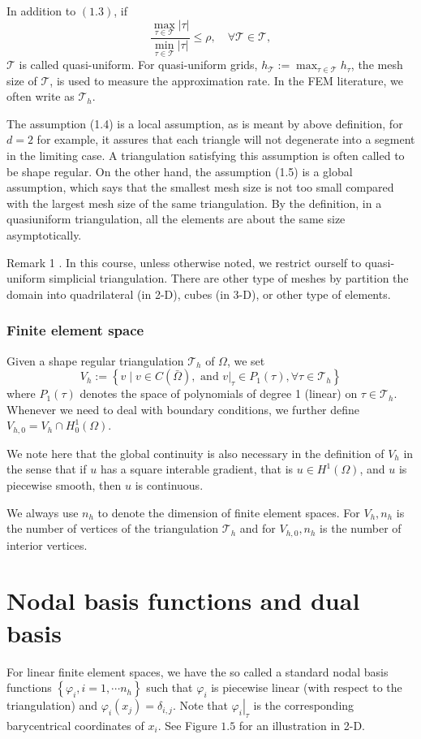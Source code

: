 \documentclass[10pt]{article}
\begin{document}
In addition to $(1.3)$, if
$$
\frac{\max _{\tau \in \mathcal{T}}|\tau|}{\min _{\tau \in \mathcal{T}}|\tau|} \leq \rho, \quad \forall \mathcal{T} \in \mathscr{T},
$$
$\mathscr{T}$ is called quasi-uniform. For quasi-uniform grids, $h_{\mathcal{T}}:=\max _{\tau \in \mathcal{T}} h_{\tau}$, the mesh size of $\mathcal{T}$, is used to measure the approximation rate. In the FEM literature, we often write as $\mathcal{T}_{h}$.

The assumption (1.4) is a local assumption, as is meant by above definition, for $d=2$ for example, it assures that each triangle will not degenerate into a segment in the limiting case. A triangulation satisfying this assumption is often called to be shape regular. On the other hand, the assumption (1.5) is a global assumption, which says that the smallest mesh size is not too small compared with the largest mesh size of the same triangulation. By the definition, in a quasiuniform triangulation, all the elements are about the same size asymptotically.

Remark 1 . In this course, unless otherwise noted, we restrict ourself to quasi-uniform simplicial triangulation. There are other type of meshes by partition the domain into quadrilateral (in 2-D), cubes (in 3-D), or other type of elements.

\subsubsection{Finite element space}
Given a shape regular triangulation $\mathcal{T}_{h}$ of $\Omega$, we set
$$
V_{h}:=\left\{v \mid v \in C(\bar{\Omega}), \text { and }\left.v\right|_{\tau} \in P_{1}(\tau), \forall \tau \in \mathcal{T}_{h}\right\}
$$
where $P_{1}(\tau)$ denotes the space of polynomials of degree 1 (linear) on $\tau \in \mathcal{T}_{h}$. Whenever we need to deal with boundary conditions, we further define $V_{h, 0}=V_{h} \cap H_{0}^{1}(\Omega)$.

We note here that the global continuity is also necessary in the definition of $V_{h}$ in the sense that if $u$ has a square interable gradient, that is $u \in H^{1}(\Omega)$, and $u$ is piecewise smooth, then $u$ is continuous.

We always use $n_{h}$ to denote the dimension of finite element spaces. For $V_{h}, n_{h}$ is the number of vertices of the triangulation $\mathcal{T}_{h}$ and for $V_{h, 0}, n_{h}$ is the number of interior vertices.

\section{Nodal basis functions and dual basis}
For linear finite element spaces, we have the so called a standard nodal basis functions $\left\{\varphi_{i}, i=1, \cdots n_{h}\right\}$ such that $\varphi_{i}$ is piecewise linear (with respect to the triangulation) and $\varphi_{i}\left(x_{j}\right)=\delta_{i, j} .$ Note that $\left.\varphi_{i}\right|_{\tau}$ is the corresponding barycentrical coordinates of $x_{i} .$ See Figure $1.5$ for an illustration in 2-D.
\end{document}
